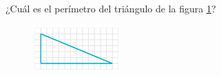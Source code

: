 
\question[25] ¿Cuál es el perímetro del triángulo de la figura \ref{fig:peri_rect_01}?
\begin{figure}[H]
    \begin{center}
        \includegraphics[width=0.3\textwidth]{../images/peri_rect_01.png}
    \end{center}
    \caption{}
    \label{fig:peri_rect_01}
\end{figure}